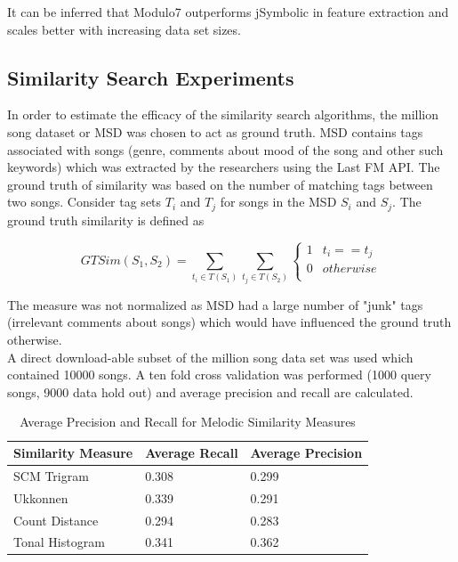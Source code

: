 \documentclass{article}
\begin{document}
\noindent It can be inferred that Modulo7 outperforms jSymbolic in feature extraction and scales better with increasing data set sizes. 

\subsection{Similarity Search Experiments}

\noindent In order to estimate the efficacy of the similarity search algorithms, the million song dataset or MSD \cite{msd} was chosen to act as ground truth. MSD contains tags associated with songs (genre, comments about mood of the song and other such keywords) which was extracted by the researchers using the Last FM API. The ground truth of similarity was based on the number of matching tags between two songs. Consider tag sets $T_i$ and $T_j$ for songs in the MSD $S_i$ and $S_j$. The ground truth similarity is defined as 

\begin{equation} \label{taghitrate}
GTSim(S_1, S_2) = \sum_{t_i \in T(S_1)} \sum_{t_j \in T(S_2)} \begin{cases} 
      1 & t_i == t_j \\
      0 & otherwise \\  \end{cases}
\end{equation}

\noindent The measure was not normalized as MSD had a large number of "junk" tags (irrelevant comments about songs) which would have influenced the ground truth otherwise. \\

\noindent A direct download-able subset of the million song data set was used which contained 10000 songs. A ten fold cross validation was performed (1000 query songs, 9000 data hold out) and average precision and recall are calculated. 

\begin{table}[h]
\begin{center}
    \begin{tabular}{| l | l | l |}
    \hline
    Similarity Measure & Average Recall & Average Precision \\ \hline
    SCM Trigram & 0.308 & 0.299 \\ \hline
    Ukkonnen & 0.339 & 0.291 \\ \hline
    Count Distance & 0.294 & 0.283  \\ \hline
    Tonal Histogram & 0.341 & 0.362  \\ \hline
    \end{tabular}
\end{center}
\caption{Average Precision and Recall for Melodic Similarity Measures}
\end{table}
\end{document}
